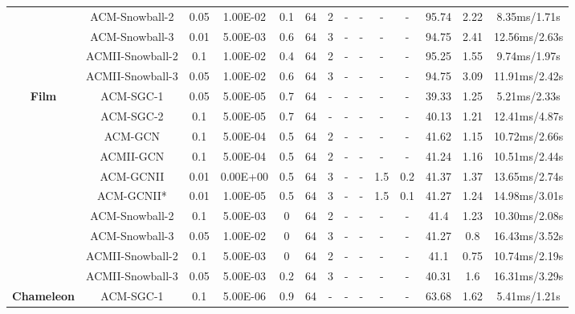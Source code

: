 \documentclass{article}
\newcommand{\0}{{\boldsymbol{0}}}
\newcommand{\6}{{\partial}}
\newcommand{\8}{{\infty}}
\newcommand{\4}{{\nabla}}
\begin{document}
\begin{table}[htbp]
{\begin{tabular}{c|c|cccccccccccc}
          & ACM-Snowball-2 & 0.05  & 1.00E-02 & 0.1   & 64    & 2     & -     & -     & -     & -     & 95.74 & 2.22  & 8.35ms/1.71s \\
          & ACM-Snowball-3 & 0.01  & 5.00E-03 & 0.6   & 64    & 3     & -     & -     & -     & -     & 94.75 & 2.41  & 12.56ms/2.63s \\
          & ACMII-Snowball-2 & 0.1   & 1.00E-02 & 0.4   & 64    & 2     & -     & -     & -     & -     & 95.25 & 1.55  & 9.74ms/1.97s \\
          & ACMII-Snowball-3 & 0.05  & 1.00E-02 & 0.6   & 64    & 3     & -     & -     & -     & -     & 94.75 & 3.09  & 11.91ms/2.42s \\
          \midrule
    \multirow{10}[0]{*}{\textbf{Film}} & ACM-SGC-1 & 0.05  & 5.00E-05 & 0.7   & 64    & -     & -     & -     & -     & -     & 39.33 & 1.25  & 5.21ms/2.33s \\
          & ACM-SGC-2 & 0.1   & 5.00E-05 & 0.7   & 64    & -     & -     & -     & -     & -     & 40.13 & 1.21  & 12.41ms/4.87s \\
          & ACM-GCN & 0.1   & 5.00E-04 & 0.5   & 64    & 2     & -     & -     & -     & -     & 41.62 & 1.15  & 10.72ms/2.66s \\
          & ACMII-GCN & 0.1   & 5.00E-04 & 0.5   & 64    & 2     & -     & -     & -     & -     & 41.24 & 1.16  & 10.51ms/2.44s \\
          & ACM-GCNII & 0.01  & 0.00E+00 & 0.5   & 64    & 3     & -     & -     & 1.5   & 0.2   & 41.37 & 1.37  & 13.65ms/2.74s \\
          & ACM-GCNII* & 0.01  & 1.00E-05 & 0.5   & 64    & 3     & -     & -     & 1.5   & 0.1   & 41.27 & 1.24  & 14.98ms/3.01s \\
          & ACM-Snowball-2 & 0.1   & 5.00E-03 & 0     & 64    & 2     & -     & -     & -     & -     & 41.4  & 1.23  & 10.30ms/2.08s \\
          & ACM-Snowball-3 & 0.05  & 1.00E-02 & 0     & 64    & 3     & -     & -     & -     & -     & 41.27 & 0.8   & 16.43ms/3.52s \\
          & ACMII-Snowball-2 & 0.1   & 5.00E-03 & 0     & 64    & 2     & -     & -     & -     & -     & 41.1  & 0.75  & 10.74ms/2.19s \\
          & ACMII-Snowball-3 & 0.05  & 5.00E-03 & 0.2   & 64    & 3     & -     & -     & -     & -     & 40.31 & 1.6   & 16.31ms/3.29s \\
          \midrule
    \multirow{10}[0]{*}{\textbf{Chameleon}} & ACM-SGC-1 & 0.1   & 5.00E-06 & 0.9   & 64    & -     & -     & -     & -     & -     & 63.68 & 1.62  & 5.41ms/1.21s \\

\end{tabular}}
\end{table}
\end{document}
